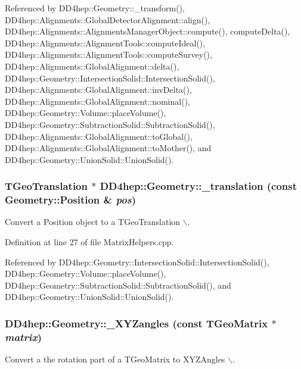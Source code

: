 Referenced by DD4hep::Geometry::\_\-transform(), DD4hep::Alignments::GlobalDetectorAlignment::align(), DD4hep::Alignments::AlignmentsManagerObject::compute(), computeDelta(), DD4hep::Alignments::AlignmentTools::computeIdeal(), DD4hep::Alignments::AlignmentTools::computeSurvey(), DD4hep::Alignments::GlobalAlignment::delta(), DD4hep::Geometry::IntersectionSolid::IntersectionSolid(), DD4hep::Alignments::GlobalAlignment::invDelta(), DD4hep::Alignments::GlobalAlignment::nominal(), DD4hep::Geometry::Volume::placeVolume(), DD4hep::Geometry::SubtractionSolid::SubtractionSolid(), DD4hep::Alignments::GlobalAlignment::toGlobal(), DD4hep::Alignments::GlobalAlignment::toMother(), and DD4hep::Geometry::UnionSolid::UnionSolid().\hypertarget{group___d_d4_h_e_p___g_e_o_m_e_t_r_y_ga2a9c214ef0a2444cccf194669fe81771}{
\subsubsection[{\_\-translation}]{\setlength{\rightskip}{0pt plus 5cm}TGeoTranslation $\ast$ DD4hep::Geometry::\_\-translation (const Geometry::Position \& {\em pos})}}
\label{group___d_d4_h_e_p___g_e_o_m_e_t_r_y_ga2a9c214ef0a2444cccf194669fe81771}


Convert a Position object to a TGeoTranslation $\backslash$. 

Definition at line 27 of file MatrixHelpers.cpp.

Referenced by DD4hep::Geometry::IntersectionSolid::IntersectionSolid(), DD4hep::Geometry::Volume::placeVolume(), DD4hep::Geometry::SubtractionSolid::SubtractionSolid(), and DD4hep::Geometry::UnionSolid::UnionSolid().\hypertarget{group___d_d4_h_e_p___g_e_o_m_e_t_r_y_gaf4d63a5a06b85c2a65143cc5f15a81fe}{
\subsubsection[{\_\-XYZangles}]{ DD4hep::Geometry::\_\-XYZangles (const TGeoMatrix $\ast$ {\em matrix})}}
\label{group___d_d4_h_e_p___g_e_o_m_e_t_r_y_gaf4d63a5a06b85c2a65143cc5f15a81fe}


Convert a the rotation part of a TGeoMatrix to XYZAngles $\backslash$. 

